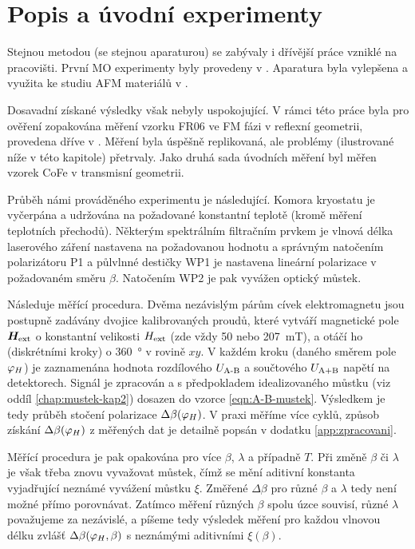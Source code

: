 \section{Popis a úvodní experimenty}
\label{chap:vychozi-situace}

Stejnou metodou (se stejnou aparaturou) se zabývaly i dřívější práce vzniklé na pracovišti.
První MO experimenty byly provedeny v \cite{wohlrathMagnetooptickaCharakterizaceSpintronickych2018}. 
Aparatura byla vylepšena a využita ke studiu AFM materiálů v \cite{kubascikMagnetooptickeStudiumAntiferomagnetickych2019,kimakOptickaSpektroskopieAntiferomagnetu2019}.

Dosavadní získané výsledky však nebyly uspokojující.
V rámci této práce byla pro ověření zopakována měření vzorku FR06 ve FM fázi v reflexní geometrii, provedena dříve v \cite{kubascikMagnetooptickeStudiumAntiferomagnetickych2019}.
Měření byla úspěšně replikovaná, ale problémy (ilustrované níže v této kapitole) přetrvaly.
Jako druhá sada úvodních měření byl měřen vzorek CoFe v transmisní geometrii.

Průběh námi prováděného experimentu je následující.
Komora kryostatu je vyčerpána a udržována na požadované konstantní teplotě (kromě měření teplotních přechodů).
Některým spektrálním filtračním prvkem je vlnová délka laserového záření nastavena na požadovanou hodnotu a správným natočením polarizátoru P1 a půlvlnné destičky WP1 je nastavena lineární polarizace v požadovaném směru $\beta$.
Natočením WP2 je pak vyvážen optický můstek.

Následuje měřící procedura. 
Dvěma nezávislým párům cívek elektromagnetu jsou postupně zadávány dvojice kalibrovaných proudů, které vytváří magnetické pole $\bm{H}_\textrm{ext}$ o konstantní velikosti $H_\textrm{ext}$ (zde vždy \num{50} nebo \SI{207}{\milli\tesla}), a otáčí ho (diskrétními kroky) o \SI{360}{\degree} v rovině $xy$.
V každém kroku (daného směrem pole $\varphi_H$) je zaznamenána hodnota rozdílového $U_\textrm{A-B}$ a součtového $U_\textrm{A+B}$ napětí na detektorech.
Signál je zpracován a s předpokladem idealizovaného můstku (viz oddíl \ref{chap:mustek-kap2}) dosazen do vzorce \eqref{eqn:A-B-mustek}.
Výsledkem je tedy průběh stočení polarizace $\Delta\beta(\varphi_H)$.
V praxi měříme více cyklů, způsob získání $\Delta\beta(\varphi_H)$ z měřených dat je detailně popsán v dodatku \ref{app:zpracovani}.

Měřící procedura je pak opakována pro více $\beta$, $\lambda$ a případně $T$.
Při změně $\beta$ či $\lambda$ je však třeba znovu vyvažovat můstek, čímž se mění aditivní konstanta vyjadřující neznámé vyvážení můstku $\xi$.
Změřené $\Delta\beta$ pro různé $\beta$ a $\lambda$ tedy není možné přímo porovnávat.
Zatímco měření různých $\beta$ spolu úzce souvisí, různé $\lambda$ považujeme za nezávislé, a píšeme tedy výsledek měření pro každou vlnovou délku zvlášť $\Delta\beta(\varphi_H, \beta)$ s neznámými aditivními $\xi(\beta)$.

